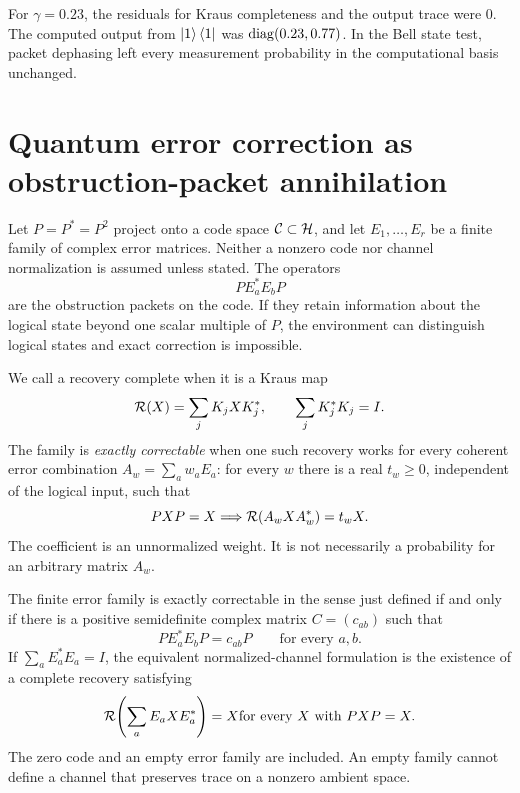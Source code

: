 \begin{certificate}\label{core:certificate:007}
For $\gamma=0.23$, the residuals for Kraus completeness and the output trace were $0$. The computed output from $\left|1\right\rangle\left\langle1\right|$ was $\operatorname{diag}(0.23,0.77)$. In the Bell state test, packet dephasing left every measurement probability in the computational basis unchanged.
\end{certificate}

\section{Quantum error correction as obstruction-packet annihilation}\label{core:section:008}

Let $P=P^*=P^2$ project onto a code space $\cC\subset\cH$, and let $E_1,\ldots,E_r$ be a finite family of complex error matrices. Neither a nonzero code nor channel normalization is assumed unless stated. The operators
\[
P E_a^*E_bP
\]
are the obstruction packets on the code. If they retain information about the logical state beyond one scalar multiple of $P$, the environment can distinguish logical states and exact correction is impossible.

We call a recovery complete when it is a Kraus map
\[
\cR(X)=\sum_jK_jXK_j^*,\qquad \sum_jK_j^*K_j=I.
\]
The family is \emph{exactly correctable} when one such recovery works for every coherent error combination $A_w=\sum_aw_aE_a$: for every $w$ there is a real $t_w\ge0$, independent of the logical input, such that
\[
PXP=X\quad\Longrightarrow\quad
\cR(A_wXA_w^*)=t_wX.
\]
The coefficient is an unnormalized weight. It is not necessarily a probability for an arbitrary matrix $A_w$.

\begin{classical}\label{core:classical:003}\label{core:thm:kl}
The finite error family is exactly correctable in the sense just defined if and only if there is a positive semidefinite complex matrix $C=(c_{ab})$ such that
\[
\boxed{PE_a^*E_bP=c_{ab}P\qquad\text{for every }a,b.}
\]
If $\sum_aE_a^*E_a=I$, the equivalent normalized-channel formulation is the existence of a complete recovery satisfying
\[
\cR\!\left(\sum_aE_aXE_a^*\right)=X
\quad\text{for every }X\text{ with }PXP=X.
\]
The zero code and an empty error family are included. An empty family cannot define a channel that preserves trace on a nonzero ambient space.
\end{classical}

